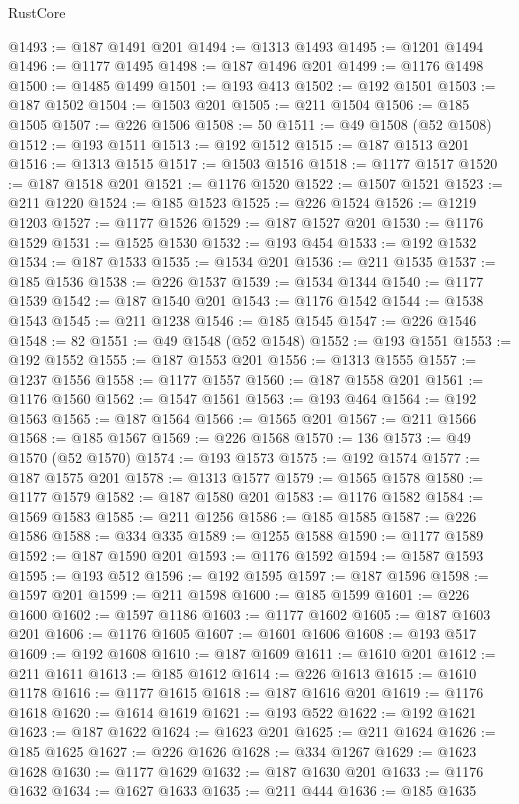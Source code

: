 \begin{lexlean}{RustCore}
\begin{coremodule}
@1493 := @187 @1491 @201
@1494 := @1313 @1493
@1495 := @1201 @1494
@1496 := @1177 @1495
@1498 := @187 @1496 @201
@1499 := @1176 @1498
@1500 := @1485 @1499
@1501 := @193 @413
@1502 := @192 @1501
@1503 := @187 @1502
@1504 := @1503 @201
@1505 := @211 @1504
@1506 := @185 @1505
@1507 := @226 @1506
@1508 := 50
@1511 := @49 @1508 (@52 @1508)
@1512 := @193 @1511
@1513 := @192 @1512
@1515 := @187 @1513 @201
@1516 := @1313 @1515
@1517 := @1503 @1516
@1518 := @1177 @1517
@1520 := @187 @1518 @201
@1521 := @1176 @1520
@1522 := @1507 @1521
@1523 := @211 @1220
@1524 := @185 @1523
@1525 := @226 @1524
@1526 := @1219 @1203
@1527 := @1177 @1526
@1529 := @187 @1527 @201
@1530 := @1176 @1529
@1531 := @1525 @1530
@1532 := @193 @454
@1533 := @192 @1532
@1534 := @187 @1533
@1535 := @1534 @201
@1536 := @211 @1535
@1537 := @185 @1536
@1538 := @226 @1537
@1539 := @1534 @1344
@1540 := @1177 @1539
@1542 := @187 @1540 @201
@1543 := @1176 @1542
@1544 := @1538 @1543
@1545 := @211 @1238
@1546 := @185 @1545
@1547 := @226 @1546
@1548 := 82
@1551 := @49 @1548 (@52 @1548)
@1552 := @193 @1551
@1553 := @192 @1552
@1555 := @187 @1553 @201
@1556 := @1313 @1555
@1557 := @1237 @1556
@1558 := @1177 @1557
@1560 := @187 @1558 @201
@1561 := @1176 @1560
@1562 := @1547 @1561
@1563 := @193 @464
@1564 := @192 @1563
@1565 := @187 @1564
@1566 := @1565 @201
@1567 := @211 @1566
@1568 := @185 @1567
@1569 := @226 @1568
@1570 := 136
@1573 := @49 @1570 (@52 @1570)
@1574 := @193 @1573
@1575 := @192 @1574
@1577 := @187 @1575 @201
@1578 := @1313 @1577
@1579 := @1565 @1578
@1580 := @1177 @1579
@1582 := @187 @1580 @201
@1583 := @1176 @1582
@1584 := @1569 @1583
@1585 := @211 @1256
@1586 := @185 @1585
@1587 := @226 @1586
@1588 := @334 @335
@1589 := @1255 @1588
@1590 := @1177 @1589
@1592 := @187 @1590 @201
@1593 := @1176 @1592
@1594 := @1587 @1593
@1595 := @193 @512
@1596 := @192 @1595
@1597 := @187 @1596
@1598 := @1597 @201
@1599 := @211 @1598
@1600 := @185 @1599
@1601 := @226 @1600
@1602 := @1597 @1186
@1603 := @1177 @1602
@1605 := @187 @1603 @201
@1606 := @1176 @1605
@1607 := @1601 @1606
@1608 := @193 @517
@1609 := @192 @1608
@1610 := @187 @1609
@1611 := @1610 @201
@1612 := @211 @1611
@1613 := @185 @1612
@1614 := @226 @1613
@1615 := @1610 @1178
@1616 := @1177 @1615
@1618 := @187 @1616 @201
@1619 := @1176 @1618
@1620 := @1614 @1619
@1621 := @193 @522
@1622 := @192 @1621
@1623 := @187 @1622
@1624 := @1623 @201
@1625 := @211 @1624
@1626 := @185 @1625
@1627 := @226 @1626
@1628 := @334 @1267
@1629 := @1623 @1628
@1630 := @1177 @1629
@1632 := @187 @1630 @201
@1633 := @1176 @1632
@1634 := @1627 @1633
@1635 := @211 @444
@1636 := @185 @1635

\end{coremodule}
\end{lexlean}
